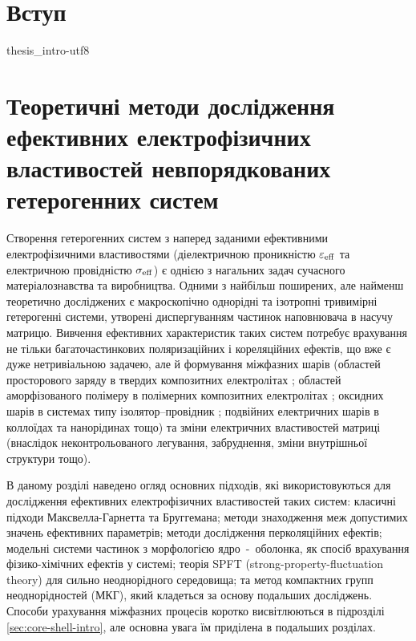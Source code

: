 \documentclass[14pt,twoside]{vakthesis}
\begin{document}
\chapter*{Вступ}

{thesis_intro-utf8}


\chapter{Теоретичні методи дослідження ефективних електрофізичних властивостей невпорядкованих гетерогенних систем}\label{sec:overview}

Створення гетерогенних систем з наперед заданими ефективними електрофізичними властивостями (діелектричною проникністю $\varepsilon_{\rm eff}$ та електричною провідністю $\sigma_{\rm eff}$) є однією з нагальних задач сучасного матеріалознавства та виробництва.
Одними з найбільш поширених, але найменш теоретично досліджених є макроскопічно однорідні та ізотропні тривимірні гетерогенні системи, утворені диспергуванням частинок наповнювача в насучу матрицю. 
Вивчення ефективних характеристик таких систем потребує врахування не тільки багаточастинкових поляризаційних і кореляційних ефектів, що вже є дуже нетривіальною задачею, але й формування міжфазних шарів (областей просторового заряду в твердих композитних електролітах \cite{Dudney1988, NanC.-W.1991}; областей аморфізованого полімеру в полімерних композитних електролітах \cite{Przl1995,Wiec1994}; оксидних шарів в системах типу ізолятор--провідник \cite{Grannan1981,ChenI.-G.1986}; подвійних електричних шарів в коллоїдах та нанорідинах \cite{sarojini2013,Ohshima1982} тощо) та зміни електричних властивостей матриці (внаслідок неконтрольованого легування, забруднення, зміни внутрішньої структури тощо).

В даному розділі наведено огляд основних підходів, які використовуються для дослідження ефективних електрофізичних властивостей таких систем: класичні підходи Макс\-велла-Гарнетта та Бруггемана; методи знаходження меж допустимих значень ефективних параметрів; методи дослідження перколяційних ефектів; модельні системи частинок з морфологією ядро~-~оболонка, як спосіб врахування фізико-хімічних ефектів у системі; теорія SPFT (strong-property-fluctuation theory) для сильно неоднорідного середовища; та метод компактних групп неоднорідностей (МКГ), який кладеться за основу подальших досліджень.
Способи урахування міжфазних процесів коротко висвітлюються в підрозділі \ref{sec:core-shell-intro}, але основна увага їм приділена в подальших розділах.
\end{document}
